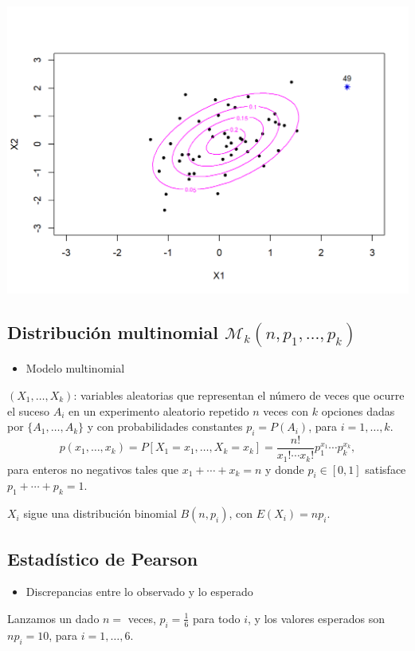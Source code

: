 \begin{center}
\includegraphics{"Temas/Imágenes/Tema 1/000015.png"}
\end{center}
\subsection{Distribución multinomial $\mathcal{M}_k(n,p_1,\dots,p_k)$}
\begin{itemize}[label=\color{red}\textbullet, leftmargin=*]
	\item \color{lightblue}Modelo multinomial
\end{itemize}
$(X_1,\dots,X_k)$: variables aleatorias que representan el número de veces que ocurre el suceso $A_i$ en un experimento aleatorio repetido $n$ veces con $k$ opciones dadas por $\{A_1,\dots,A_k\}$ y con probabilidades constantes $p_i=P(A_i)$, para $i=1,\dots,k$.
 \[ p(x_1,\dots,x_k)=P[X_1=x_1,\dots,X_k=x_k]=\dfrac{n!}{x_1!\cdots x_k!}p_1^{x_1}\cdots p_k^{x_k}, \] para enteros no negativos tales que $x_1+\cdots+x_k=n$ y donde $p_i\in[0,1]$ satisface $p_1+\cdots+p_k=1$.

 $X_i$ sigue una distribución binomial $B(n,p_i)$, con $E(X_i)=np_i$.
\subsection{Estadístico de Pearson}
\begin{itemize}[label=\color{red}\textbullet, leftmargin=*]
	\item \color{lightblue}Discrepancias entre lo observado y lo esperado
\end{itemize}
 Lanzamos un dado $n=$ veces, $p_i=\frac{1}{6}$ para todo $i$, y los valores esperados son $np_i=10$, para $i=1,\dots,6$.

